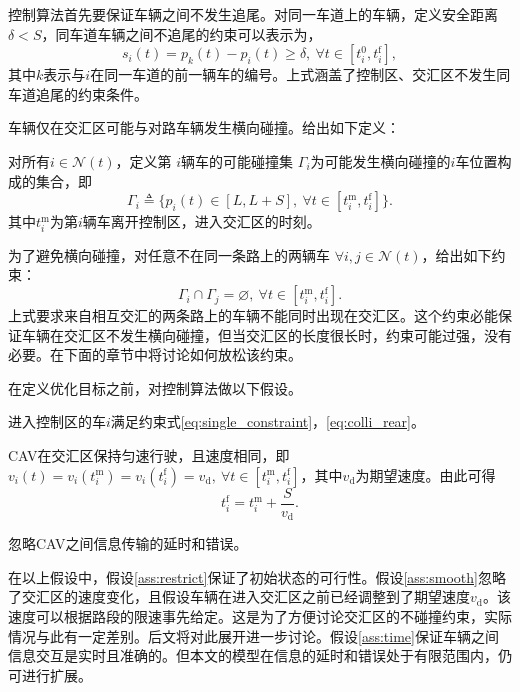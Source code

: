 控制算法首先要保证车辆之间不发生追尾。对同一车道上的车辆，定义安全距离$\delta < S$，同车道车辆之间不追尾的约束可以表示为，
\begin{equation}
s_i(t)=p_k(t)-p_i(t)\geq \delta, \ \forall t\in [t_i^0, t_i^\mathrm{f}],
\label{eq:colli_rear}
\end{equation}
其中$k$表示与$i$在同一车道的前一辆车的编号。上式涵盖了控制区、交汇区不发生同车道追尾的约束条件。

车辆仅在交汇区可能与对路车辆发生横向碰撞。给出如下定义：
\begin{definition}
对所有$i\in \mathcal{N}(t)$，定义第 $i$辆车的{\heiti 可能碰撞集} $\Gamma_i$为可能发生横向碰撞的$i$车位置构成的集合，即
\begin{equation}
\Gamma_i\triangleq \{p_i(t)\in[L,L+S],\  \forall t\in [t_i^\mathrm{m},t_i^\mathrm{f}]\}.
\end{equation}
其中$t_i^\mathrm{m}$为第$i$辆车离开控制区，进入交汇区的时刻。
\end{definition}
为了避免横向碰撞，对任意不在同一条路上的两辆车 $\forall i,j\in \mathcal{N}(t)$，给出如下约束：
\begin{equation}
\Gamma_i\cap \Gamma_j=\varnothing, \ \forall t\in [t_i^\mathrm{m},t_i^\mathrm{f}].
\label{eq:colli_lateral}
\end{equation}
上式要求来自相互交汇的两条路上的车辆不能同时出现在交汇区。这个约束必能保证车辆在交汇区不发生横向碰撞，但当交汇区的长度很长时，约束可能过强，没有必要。在下面的章节中将讨论如何放松该约束。

在定义优化目标之前，对控制算法做以下假设。
\begin{assumption}
进入控制区的车$i$满足约束式\ref{eq:single_constraint}，\ref{eq:colli_rear}。
\label{ass:restrict}
\end{assumption}
\begin{assumption}
CAV在交汇区保持匀速行驶，且速度相同，即$v_i(t) = v_i(t_i^\mathrm{m}) = v_i(t_i^\mathrm{f}) = v_\mathrm{d}, \ \forall t\in [t_i^\mathrm{m},t_i^\mathrm{f}]$，其中$v_\mathrm{d}$为期望速度。由此可得
\begin{equation}
t_i^\mathrm{f}=t_i^\mathrm{m} + \frac{S}{v_\mathrm{d}}.
\end{equation}
\label{ass:smooth}
\end{assumption}
\begin{assumption}
忽略CAV之间信息传输的延时和错误。
\label{ass:time}
\end{assumption}

在以上假设中，假设\ref{ass:restrict}保证了初始状态的可行性。假设\ref{ass:smooth}忽略了交汇区的速度变化，且假设车辆在进入交汇区之前已经调整到了期望速度$v_\mathrm{d}$。该速度可以根据路段的限速事先给定。这是为了方便讨论交汇区的不碰撞约束，实际情况与此有一定差别。后文将对此展开进一步讨论。假设\ref{ass:time}保证车辆之间信息交互是实时且准确的。但本文的模型在信息的延时和错误处于有限范围内，仍可进行扩展。

